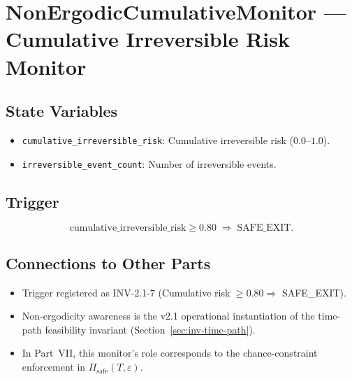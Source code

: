 
\chapter{NonErgodicCumulativeMonitor ---
Cumulative Irreversible Risk Monitor}
\label{ch:non-ergodic-monitor}

\section{State Variables}
\label{sec:non-ergodic-state}

\begin{itemize}
\item \texttt{cumulative\_irreversible\_risk}: Cumulative
irreversible risk ($0.0$--$1.0$).
\item \texttt{irreversible\_event\_count}: Number of irreversible
events.
\end{itemize}

\section{Trigger}
\label{sec:non-ergodic-trigger}

\begin{equation}
\mathrm{cumulative\_irreversible\_risk} \ge 0.80
\;\Rightarrow\;
\mathrm{SAFE\_EXIT}.
\label{eq:non-ergodic-trigger}
\end{equation}

\section*{Connections to Other Parts}

\begin{itemize}
\item Trigger registered as INV-2.1-7
(Cumulative risk $\ge 0.80 \Rightarrow$ SAFE\_EXIT).
\item Non-ergodicity awareness is the v2.1 operational instantiation
of the time-path feasibility invariant
(Section~\ref{sec:inv-time-path}).
\item In Part~VII, this monitor's role corresponds to the
chance-constraint enforcement in
$\Pi_{\mathrm{safe}}(T, \varepsilon)$.
\end{itemize}
